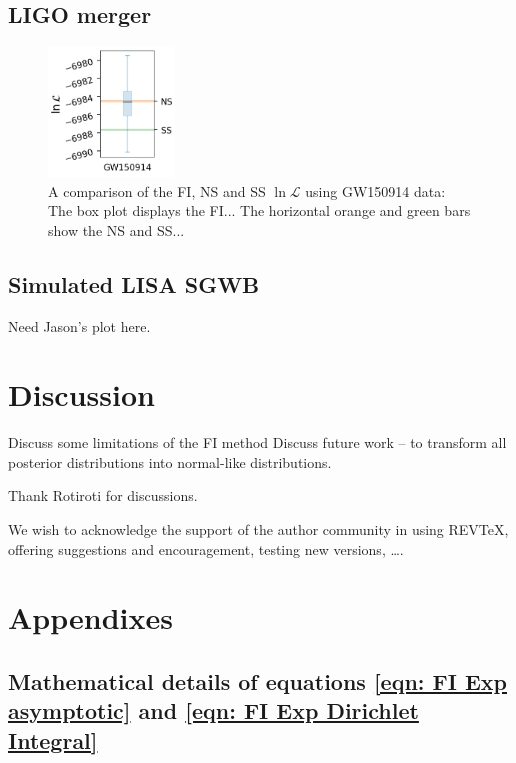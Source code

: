 \documentclass[%
 reprint,
 amsmath,amssymb,
 aps,
]{revtex4-2}
\begin{document}
\subsection{\label{subsec:LIGO} LIGO merger}


\begin{figure}[h]
\caption{A comparison of the FI, NS and SS $\ln \mathcal{L}$ using GW150914 data: The box plot displays the FI... The horizontal orange and green bars show the NS and SS... }
\centering
\includegraphics[width=0.3\textwidth]{figures/GW150914.png}
\end{figure}

\subsection{\label{subsec:LISA} Simulated LISA SGWB}

Need Jason's plot here.



\section{\label{sec:discussion} Discussion}
Discuss some limitations of the FI method
Discuss future work -- to transform all posterior distributions into normal-like distributions.




\begin{acknowledgments}
Thank Rotiroti for discussions.

We wish to acknowledge the support of the author community in using
REV\TeX{}, offering suggestions and encouragement, testing new versions,
\dots.
\end{acknowledgments}

\appendix
\section{Appendixes}

\subsection{Mathematical details of equations \eqref{eqn: FI Exp asymptotic} and \eqref{eqn: FI Exp Dirichlet Integral}}
\label{subsec: maths details of the FI Exp example}
\end{document}
